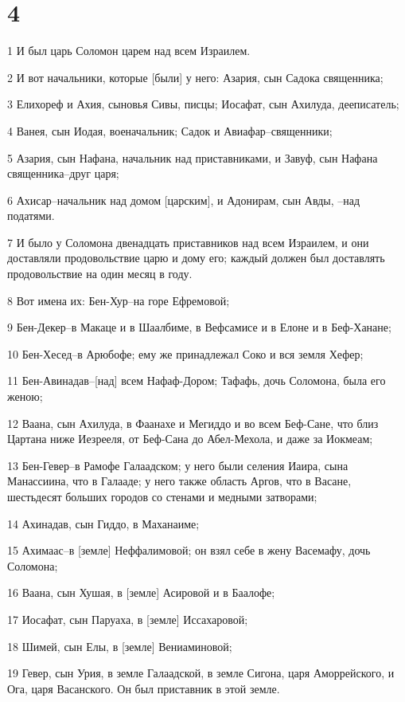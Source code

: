 \chapter{4}

\par 1 И был царь Соломон царем над всем Израилем.
\par 2 И вот начальники, которые [были] у него: Азария, сын Садока священника;
\par 3 Елихореф и Ахия, сыновья Сивы, писцы; Иосафат, сын Ахилуда, дееписатель;
\par 4 Ванея, сын Иодая, военачальник; Садок и Авиафар--священники;
\par 5 Азария, сын Нафана, начальник над приставниками, и Завуф, сын Нафана священника--друг царя;
\par 6 Ахисар--начальник над домом [царским], и Адонирам, сын Авды, --над податями.
\par 7 И было у Соломона двенадцать приставников над всем Израилем, и они доставляли продовольствие царю и дому его; каждый должен был доставлять продовольствие на один месяц в году.
\par 8 Вот имена их: Бен-Хур--на горе Ефремовой;
\par 9 Бен-Декер--в Макаце и в Шаалбиме, в Вефсамисе и в Елоне и в Беф-Ханане;
\par 10 Бен-Хесед--в Арюбофе; ему же принадлежал Соко и вся земля Хефер;
\par 11 Бен-Авинадав--[над] всем Нафаф-Дором; Тафафь, дочь Соломона, была его женою;
\par 12 Ваана, сын Ахилуда, в Фаанахе и Мегиддо и во всем Беф-Сане, что близ Цартана ниже Иезрееля, от Беф-Сана до Абел-Мехола, и даже за Иокмеам;
\par 13 Бен-Гевер--в Рамофе Галаадском; у него были селения Иаира, сына Манассиина, что в Галааде; у него также область Аргов, что в Васане, шестьдесят больших городов со стенами и медными затворами;
\par 14 Ахинадав, сын Гиддо, в Маханаиме;
\par 15 Ахимаас--в [земле] Неффалимовой; он взял себе в жену Васемафу, дочь Соломона;
\par 16 Ваана, сын Хушая, в [земле] Асировой и в Баалофе;
\par 17 Иосафат, сын Паруаха, в [земле] Иссахаровой;
\par 18 Шимей, сын Елы, в [земле] Вениаминовой;
\par 19 Гевер, сын Урия, в земле Галаадской, в земле Сигона, царя Аморрейского, и Ога, царя Васанского. Он был приставник в этой земле.
